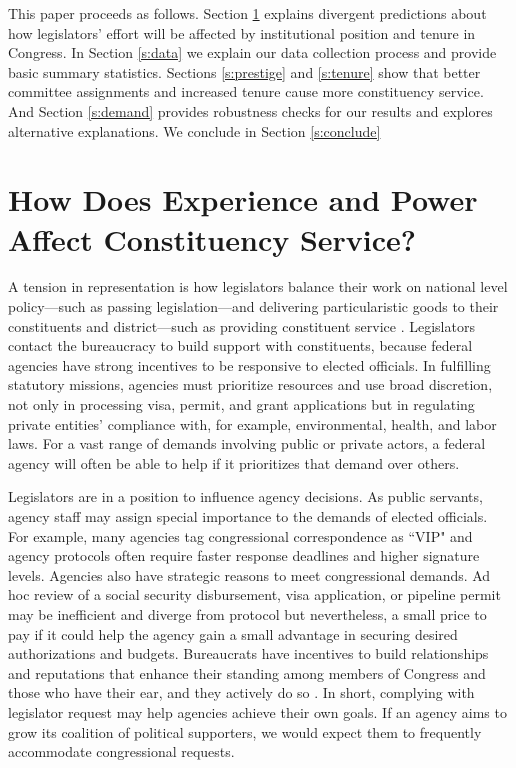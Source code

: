 \documentclass[12pt]{article}
\begin{document}
This paper proceeds as follows.  Section \ref{s:theory} explains divergent predictions about how legislators' effort will be affected by institutional position and tenure in Congress.  In Section \ref{s:data} we explain our data collection process and provide basic summary statistics.  Sections \ref{s:prestige} and \ref{s:tenure} show that better committee assignments and increased tenure cause more constituency service.  And Section \ref{s:demand} provides robustness checks for our results and explores alternative explanations.  We conclude in Section \ref{s:conclude}


\section{How Does Experience and Power Affect Constituency Service?} \label{s:theory}

A tension in representation is how legislators balance their work on national level policy---such as passing legislation---and delivering particularistic goods to their constituents and district---such as providing constituent service \citep{AshworthBuenodeMesquita2006}.  Legislators contact the bureaucracy to build support with constituents, because federal agencies have strong incentives to be responsive to elected officials. In fulfilling statutory missions, agencies must prioritize resources and use broad discretion, not only in processing visa, permit, and grant applications but in regulating private entities' compliance with, for example, environmental, health, and labor laws. For a vast range of demands involving public or private actors, a federal agency will often be able to help if it prioritizes that demand over others. 

Legislators are in a position to influence agency decisions. As public servants, agency staff may assign special importance to the demands of elected officials.  For example, many agencies tag congressional correspondence as ``VIP" and agency protocols often require faster response deadlines and higher signature levels. Agencies also have strategic reasons to meet congressional demands. Ad hoc review of a social security disbursement, visa application, or pipeline permit may be inefficient and diverge from protocol but nevertheless, a small price to pay if it could help the agency gain a small advantage in securing desired authorizations and budgets.  Bureaucrats have incentives to build relationships and reputations that enhance their standing among members of Congress and those who have their ear, and they actively do so \citep{Carpenter2001}.  In short, complying with legislator request may help agencies achieve their own goals.  If an agency aims to grow its coalition of political supporters, we would expect them to frequently accommodate congressional requests.
\end{document}
